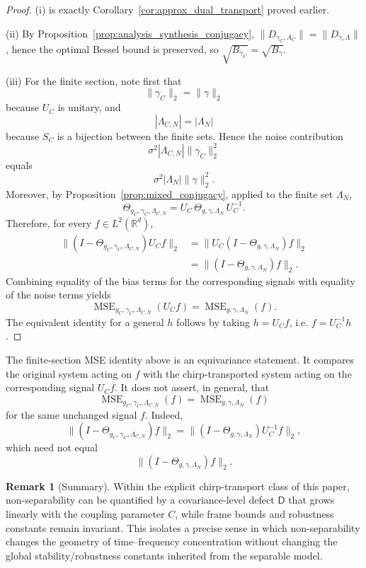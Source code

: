 \documentclass[final,1p,times,authoryear]{elsarticle}
\theoremstyle{definition}
\newtheorem{remark}[theorem]{Remark}
\newcommand{\R}{\mathbb{R}}
\newcommand{\1}{\mathbf{1}}
\begin{document}
\begin{proof}
(i) is exactly Corollary~\ref{cor:approx_dual_transport} proved earlier.

(ii) By Proposition~\ref{prop:analysis_synthesis_conjugacy}, $\|D_{\gamma_C,\Lambda_C}\|=\|D_{\gamma,\Lambda}\|$,
hence the optimal Bessel bound is preserved, so $\sqrt{B_{\gamma_C}}=\sqrt{B_\gamma}$.

(iii) {For the finite section, note first that
$$
\|\gamma_C\|_2=\|\gamma\|_2
$$
because $U_C$ is unitary, and
$$
|\Lambda_{C,N}|=|\Lambda_N|
$$
because $S_C$ is a bijection between the finite sets. Hence the noise contribution
$$
\sigma^2|\Lambda_{C,N}|\|\gamma_C\|_2^2
$$
equals
$$
\sigma^2|\Lambda_N|\|\gamma\|_2^2.
$$
Moreover, by Proposition~\ref{prop:mixed_conjugacy}, applied to the finite set $\Lambda_N$,
$$
\Theta_{g_C,\gamma_C,\Lambda_{C,N}}
=
U_C\,\Theta_{g,\gamma,\Lambda_N}\,U_C^{-1}.
$$
Therefore, for every $f\in L^2(\R^d)$,
$$
\begin{aligned}
\|(I-\Theta_{g_C,\gamma_C,\Lambda_{C,N}})U_Cf\|_2
&=
\|U_C(I-\Theta_{g,\gamma,\Lambda_N})f\|_2 \\
&=
\|(I-\Theta_{g,\gamma,\Lambda_N})f\|_2.
\end{aligned}
$$
Combining equality of the bias terms for the corresponding signals with equality of the noise
terms yields
$$
\operatorname{MSE}_{g_C,\gamma_C,\Lambda_{C,N}}(U_Cf)
=
\operatorname{MSE}_{g,\gamma,\Lambda_N}(f).
$$
The equivalent identity for a general $h$ follows by taking $h=U_Cf$, i.e. $f=U_C^{-1}h$.}
\end{proof}
{The finite-section MSE identity above is an equivariance statement. It compares the original
system acting on $f$ with the chirp-transported system acting on the corresponding signal
$U_Cf$. It does not assert, in general, that
$$
\operatorname{MSE}_{g_C,\gamma_C,\Lambda_{C,N}}(f)
=
\operatorname{MSE}_{g,\gamma,\Lambda_N}(f)
$$
for the same unchanged signal $f$. Indeed,
$$
\|(I-\Theta_{g_C,\gamma_C,\Lambda_{C,N}})f\|_2
=
\|(I-\Theta_{g,\gamma,\Lambda_N})U_C^{-1}f\|_2,
$$
which need not equal
$$
\|(I-\Theta_{g,\gamma,\Lambda_N})f\|_2.
$$
}
\begin{remark}[Summary]
Within the explicit chirp-transport class of this paper, non-separability can be quantified by a covariance-level defect
$\mathsf D$ that grows linearly with the coupling parameter $C$, while frame bounds and robustness constants remain invariant.
This isolates a precise sense in which non-separability changes the geometry of time--frequency concentration without changing
the global stability/robustness constants inherited from the separable model.
\end{remark}
\end{document}
